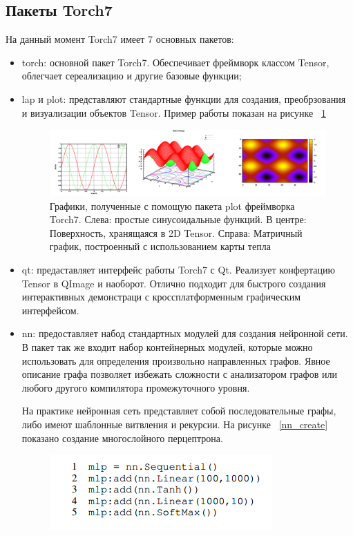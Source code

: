 \documentclass[a4paper,english,russian]{G2-105}
\begin{document}
\subsection{Пакеты Torch7}
\par На данный момент Torch7 имеет 7 основных пакетов:
\begin{itemize}
\item torch: основной пакет Torch7. Обеспечивает фреймворк классом Tensor, облегчает сереализацию и другие базовые функции;
\item lap и plot: представляют стандартные функции для создания, преобрзования и визуализации объектов Tensor. Пример работы показан на рисунке ~\ref{torch_plots}
\begin{figure}
    \includegraphics[width=\linewidth]{torch_plots.png}
    \caption{Графики, полученные с помощую пакета plot фреймворка Torch7. Слева: простые синусоидальные функций. В центре: Поверхность, хранящаяся в 2D Tensor. Справа: Матричный график, построенный с использованием карты тепла}
	\label{torch_plots}
\end{figure}
\item qt: предаставляет интерфейс работы Torch7 с Qt. Реализует конфертацию Tensor в QImage и наоборот. Отлично подходит для быстрого создания интерактивных демонстраци с кроссплатформенным графическим интерфейсом.
\item nn: предоставляет набод стандартных модулей для создания нейронной сети. В пакет так же входит набор контейнерных модулей, которые можно использовать для определения произвольно направленных графов. Явное описание графа позволяет избежать сложности с анализатором графов или любого другого компилятора промежуточного уровня.
\par На практике нейронная сеть представляет собой последовательные графы, либо имеют шаблонные витвления и рекурсии. На рисунке ~\ref{nn_create} показано создание многослойного перцептрона.
\begin{figure}
    \includegraphics[width=0.3\paperheight]{nn_create.png}

\end{figure}
\end{itemize}
\end{document}

